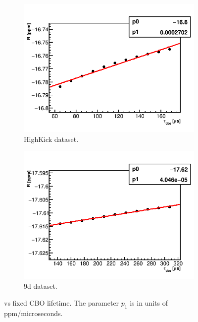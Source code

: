 \begin{figure}[h]
\centering
    \begin{subfigure}[t]{0.45\textwidth}
        \centering
        \includegraphics[width=\textwidth]{FullRatio_R_Vs_tau_cbo_Canv_HK}
        \caption{HighKick dataset.}
    \end{subfigure}%
    \hspace{1cm}
    \begin{subfigure}[t]{0.45\textwidth}
        \centering
        \includegraphics[width=\textwidth]{FullRatio_R_Vs_tau_cbo_Canv_9d}
        \caption{9d dataset.}
    \end{subfigure}
\caption[]{\R vs fixed CBO lifetime. The parameter $p_{1}$ is in units of ppm/microseconds.}
\label{fig:CBOfixedLifetime}
\end{figure}


